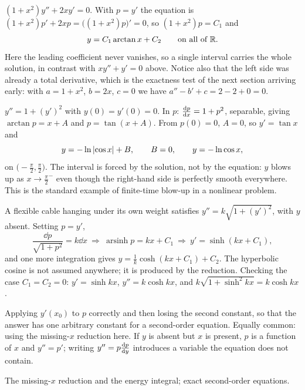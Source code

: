 \begin{worked}
$(1+x^{2})y''+2xy'=0$. With $p=y'$ the equation is $(1+x^{2})p'+2xp=\bigl((1+x^{2})p\bigr)'=0$, so $(1+x^{2})p=C_1$ and
\[y=C_1\arctan x+C_2\qquad\text{on all of }\mathbb{R}.\]
Here the leading coefficient never vanishes, so a single interval carries the whole solution, in contrast with $xy''+y'=0$ above. Notice also that the left side was already a total derivative, which is the exactness test of the next section arriving early: with $a=1+x^{2}$, $b=2x$, $c=0$ we have $a''-b'+c=2-2+0=0$.
\end{worked}

\begin{worked}
$y''=1+(y')^{2}$ with $y(0)=y'(0)=0$. In $p$: $\frac{\mathrm{d}p}{\mathrm{d}x}=1+p^{2}$, separable, giving $\arctan p=x+A$ and $p=\tan(x+A)$. From $p(0)=0$, $A=0$, so $y'=\tan x$ and
\[y=-\ln\left\lvert \cos x\right\rvert+B,\qquad B=0,\qquad y=-\ln\cos x,\]
on $\bigl(-\tfrac{\pi}{2},\tfrac{\pi}{2}\bigr)$. The interval is forced by the solution, not by the equation: $y$ blows up as $x\to\tfrac{\pi}{2}^{-}$ even though the right-hand side is perfectly smooth everywhere. This is the standard example of finite-time blow-up in a nonlinear problem.
\end{worked}

\begin{worked}
A flexible cable hanging under its own weight satisfies $y''=k\sqrt{1+(y')^{2}}$, with $y$ absent. Setting $p=y'$,
\[\frac{\dd p}{\sqrt{1+p^{2}}}=k\dd x\ \Longrightarrow\ \operatorname{arsinh}p=kx+C_1\ \Longrightarrow\ y'=\sinh(kx+C_1),\]
and one more integration gives $y=\tfrac1k\cosh(kx+C_1)+C_2$. The hyperbolic cosine is not assumed anywhere; it is produced by the reduction. Checking the case $C_1=C_2=0$: $y'=\sinh kx$, $y''=k\cosh kx$, and $k\sqrt{1+\sinh^{2}kx}=k\cosh kx$.
\end{worked}

\begin{trap}
Applying $y'(x_0)$ to $p$ correctly and then losing the second constant, so that the answer has one arbitrary constant for a second-order equation. Equally common: using the missing-$x$ reduction here. If $y$ is absent but $x$ is present, $p$ is a function of $x$ and $y''=p'$; writing $y''=p\frac{\mathrm{d}p}{\mathrm{d}y}$ introduces a variable the equation does not contain.
\end{trap}

\begin{seealsob}The missing-$x$ reduction and the energy integral; exact second-order equations.\end{seealsob}

